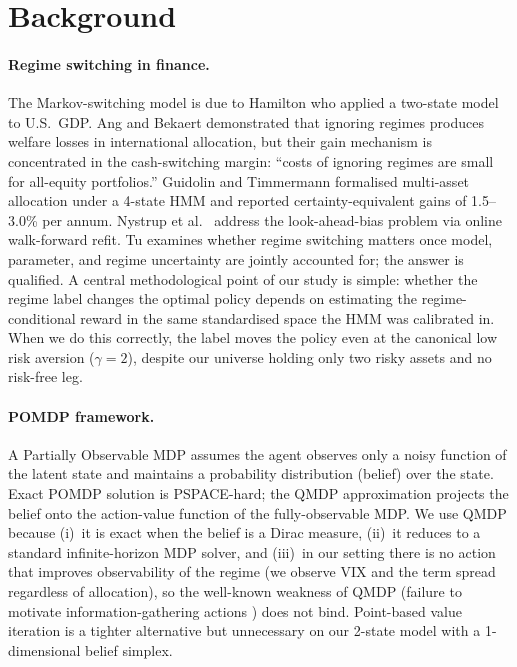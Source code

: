 \documentclass[11pt]{article}
\theoremstyle{plain1}
\theoremstyle{definition1}
\newcommand{\1}{\mathbf{1}}
\begin{document}
\section{Background}\label{sec:background}

\paragraph{Regime switching in finance.} The Markov-switching model is due to Hamilton \cite{hamilton1989} who applied a two-state model to U.S.\ GDP. Ang and Bekaert \cite{ang2002} demonstrated that ignoring regimes produces welfare losses in international allocation, but their gain mechanism is concentrated in the cash-switching margin: ``costs of ignoring regimes are small for all-equity portfolios.'' Guidolin and Timmermann \cite{guidolin2007} formalised multi-asset allocation under a 4-state HMM and reported certainty-equivalent gains of 1.5--3.0\% per annum. Nystrup et al.\ \cite{nystrup2018} address the look-ahead-bias problem via online walk-forward refit. Tu \cite{tu2010} examines whether regime switching matters once model, parameter, and regime uncertainty are jointly accounted for; the answer is qualified. A central methodological point of our study is simple: whether the regime label changes the optimal policy depends on estimating the regime-conditional reward in the same standardised space the HMM was calibrated in. When we do this correctly, the label moves the policy even at the canonical low risk aversion ($\gamma{=}2$), despite our universe holding only two risky assets and no risk-free leg.

\paragraph{POMDP framework.} A Partially Observable MDP \cite{kaelbling1998} assumes the agent observes only a noisy function of the latent state and maintains a probability distribution (belief) over the state. Exact POMDP solution is PSPACE-hard; the QMDP approximation \cite{littman1995} projects the belief onto the action-value function of the fully-observable MDP. We use QMDP because (i)~it is exact when the belief is a Dirac measure, (ii)~it reduces to a standard infinite-horizon MDP solver, and (iii)~in our setting there is no action that improves observability of the regime (we observe VIX and the term spread regardless of allocation), so the well-known weakness of QMDP (failure to motivate information-gathering actions \cite{hauskrecht2000}) does not bind. Point-based value iteration \cite{pineau2003} is a tighter alternative but unnecessary on our 2-state model with a 1-dimensional belief simplex.
\end{document}
